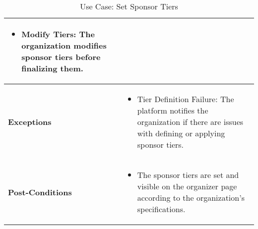 \begin{table}[!ht]
\begin{tabularx}{\textwidth}{|l|X|}
\begin{itemize}[label=--,itemsep=0pt]
            \item Modify Tiers: The organization modifies sponsor tiers before finalizing them.
        \end{itemize} \\
        \hline
        \textbf{Exceptions} & 
        \begin{itemize}[label=--,itemsep=0pt]
            \item Tier Definition Failure: The platform notifies the organization if there are issues with defining or applying sponsor tiers.
        \end{itemize} \\
        \hline
        \textbf{Post-Conditions} & 
        \begin{itemize}[label=--,itemsep=0pt]
            \item The sponsor tiers are set and visible on the organizer page according to the organization’s specifications.
        \end{itemize} \\
        \hline
    \end{tabularx}
    \caption{Use Case: Set Sponsor Tiers}
    \label{tab:use-case-set-sponsor-tiers}
\end{table}



